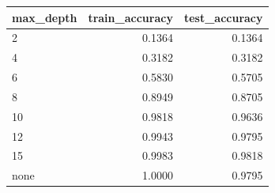 \begin{tabular}{lrr}
\toprule
max_depth & train_accuracy & test_accuracy \\
\midrule
2 & 0.1364 & 0.1364 \\
4 & 0.3182 & 0.3182 \\
6 & 0.5830 & 0.5705 \\
8 & 0.8949 & 0.8705 \\
10 & 0.9818 & 0.9636 \\
12 & 0.9943 & 0.9795 \\
15 & 0.9983 & 0.9818 \\
none & 1.0000 & 0.9795 \\
\bottomrule
\end{tabular}
